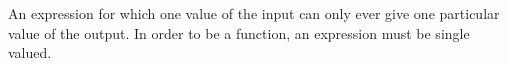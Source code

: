 An expression for which one value of the input 
can only ever give one particular value of the 
output. In order to be a function, an expression 
must be single valued.